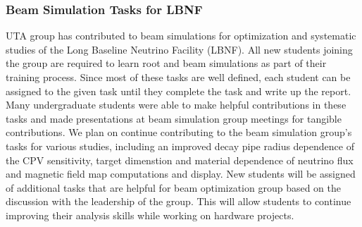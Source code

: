 \subsubsection {Beam Simulation Tasks for LBNF}
UTA group has contributed to beam simulations for optimization and systematic studies of the Long Baseline Neutrino Facility (LBNF).
All new students joining the group are required to learn root and beam simulations as part of their training process.  
Since most of these tasks are well defined, each student can be assigned to the given task until they complete the task and 
write up the report.
Many undergraduate students were able to make helpful contributions in these tasks and made presentations at beam simulation group 
meetings for tangible contributions.
We plan on continue contributing to the beam simulation group's tasks for various studies, including an improved decay pipe 
radius dependence of the CPV sensitivity, target dimenstion and material dependence of neutrino flux and magnetic field map 
computations and display.
New students will be assigned of additional tasks that are helpful for beam optimization group based on the discussion with the
leadership of the group.
This will allow students to continue improving their analysis skills while working on hardware projects.
%
%

%
%

